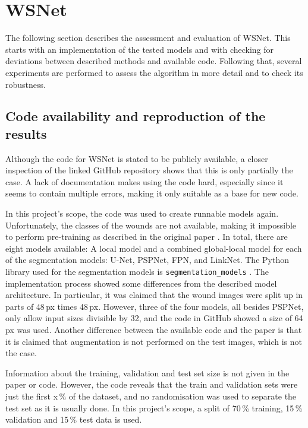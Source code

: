 \section{WSNet}

The following section describes the assessment and evaluation of WSNet. This starts with an implementation of the tested models and with checking for deviations between described methods and available code. Following that, several experiments are performed to assess the algorithm in more detail and to check its robustness.

\subsection{Code availability and reproduction of the results}

Although the code for WSNet \cite{Oota_2023_WACV} is stated to be publicly available, a closer inspection of the linked GitHub repository shows that this is only partially the case. A lack of documentation makes using the code hard, especially since it seems to contain multiple errors, making it only suitable as a base for new code.

In this project's scope, the code was used to create runnable models again. Unfortunately, the classes of the wounds are not available, making it impossible to perform pre-training as described in the original paper \cite{Oota_2023_WACV}. In total, there are eight models available: A local model and a combined global-local model for each of the segmentation models: U-Net, PSPNet, FPN, and LinkNet. The Python library used for the segmentation models is \texttt{segmentation\_models} \cite{SegmentationModels}. The implementation process showed some differences from the described model architecture. In particular, it was claimed that the wound images were split up in parts of 48\,px times 48\,px. However, three of the four models, all besides PSPNet, only allow input sizes divisible by 32, and the code in GitHub showed a size of 64\,px was used. Another difference between the available code and the paper is that it is claimed that augmentation is not performed on the test images, which is not the case.

Information about the training, validation and test set size is not given in the paper or code. However, the code reveals that the train and validation sets were just the first x\,\% of the dataset, and no randomisation was used to separate the test set as it is usually done. In this project's scope, a split of 70\,\% training, 15\,\% validation and 15\,\% test data is used.

